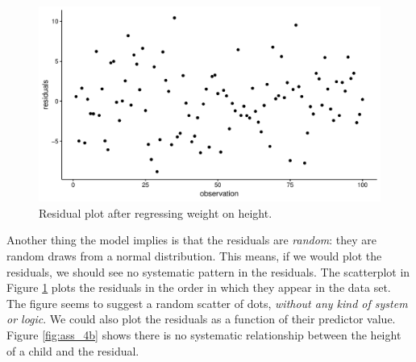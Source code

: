 \documentclass[]{book}\usepackage[]{graphicx}\usepackage[]{color}
\makeatletter
\def\maxwidth{ %
  \ifdim\Gin@nat@width>\linewidth
    \linewidth
  \else
    \Gin@nat@width
  \fi
}
\newenvironment{knitrout}{}{} %
\makeatother
\begin{document}
\begin{knitrout}
\color{fgcolor}\begin{figure}

{\centering \includegraphics[width=\maxwidth]{figure/ass_4-1} 

}

\caption[Residual plot after regressing weight on height]{Residual plot after regressing weight on height.}\label{fig:ass_4}
\end{figure}


\end{knitrout}

Another thing the model implies is that the residuals are \textit{random}: they are random draws from a normal distribution. This means, if we would plot the residuals, we should see no systematic pattern in the residuals. The scatterplot in Figure \ref{fig:ass_4} plots the residuals in the order in which they appear in the data set. The figure seems to suggest a random scatter of dots, \textit{without any kind of system or logic}. We could also plot the residuals as a function of their predictor value. Figure \ref{fig:ass_4b} shows there is no systematic relationship between the height of a child and the residual.  
\end{document}
